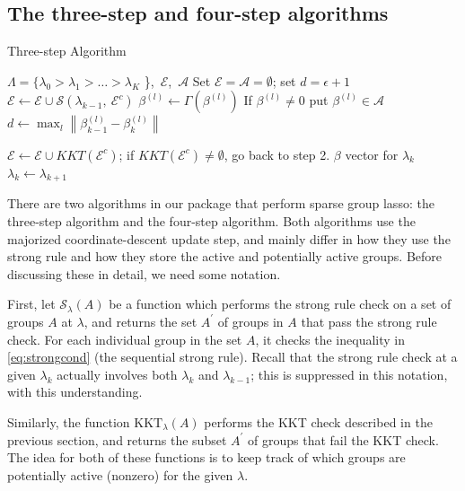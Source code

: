 \documentclass[titlepage]{article}
\newcommand{\norm}[1]{\left\lVert #1 \right\rVert}
\begin{document}
\subsection{The three-step and four-step algorithms}


\begin{algorithm}[tb!]
  \caption{Three-step Algorithm\label{alg:threeStep}}
  \begin{algorithmic}
     $\Lambda = \{\lambda_0>\lambda_1> \dots > \lambda_K$ \},\ $\mathcal{E}$,\ $\mathcal{A}$
    \STATE Set $\mathcal{E}=\mathcal{A}=\emptyset$; set $d=\epsilon+1$
     $\mathcal{E} \leftarrow  \mathcal{E}\cup \mathcal{S}(\lambda_{k-1},\ \mathcal{E}^c)$
    \STATE  $\beta^{(l)} \leftarrow \Gamma (\beta^{(l)})$
    \STATE If $\beta^{(l)} \neq 0$ put $\beta^{(l)} \in \mathcal{A}$	
	\ENDFOR
	\STATE $d \leftarrow \max_{l} \norm{\beta^{(l)}_{k-1}-\beta^{(l)}_{k}}$ 
	\ENDWHILE    
    
     $\mathcal{E} \leftarrow  \mathcal{E}\cup KKT(\mathcal{E}^c)$; if $KKT(\mathcal{E}^c) \neq \emptyset$, go back to step 2.  
    \RETURN $\beta$ vector for $\lambda_k$
    \STATE $\lambda_k \leftarrow \lambda_{k+1}$
  \end{algorithmic}
\end{algorithm}


There are two algorithms in our package that perform sparse group lasso: the three-step algorithm and the four-step algorithm. Both algorithms use the majorized coordinate-descent update step, and mainly differ in how they use the strong rule and how they store the active and potentially active groups. Before discussing these in detail, we need some notation.

First, let $\mathcal{S}_{\lambda}(A)$ be a function which performs the strong rule check on a set of groups $A$ at $\lambda$, and returns the set $A^{\prime}$ of groups in $A$ that pass the strong rule check. For each individual group in the set $A$, it checks the inequality in \autoref{eq:strongcond} (the sequential strong rule). Recall that the strong rule check at a given $\lambda_k$ actually involves both $\lambda_{k}$ and $\lambda_{k-1}$; this is suppressed in this notation, with this understanding.

Similarly, the function $\textrm{KKT}_{\lambda} (A)$ performs the KKT check described in the previous section, and returns the subset $A^{\prime}$ of groups that fail the KKT check. The idea for both of these functions is to keep track of which groups are potentially active (nonzero) for the given $\lambda$. 
\end{document}
